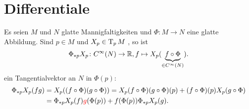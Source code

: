 
\chapter{Differentiale}
Es seien $M$ und $N$ glatte Mannigfaltigkeiten und $\Phi \colon M \to N$ eine glatte Abbildung.
Sind $p \in M$ und $X_p \in \operatorname{T}_pM$ , so ist 
\begin{align*}
	\Phi_{*p}X_p \colon C^{\infty}(N) \to \operatorname{\mathbb{R}}, f \mapsto X_p(\underbrace{f \circ \Phi}_{\in C^{\infty}(N)}).
\end{align*}
ein Tangentialvektor an $N$ in $\Phi(p)$:
\begin{align*}
	\Phi_{*p}X_p(fg) & = X_p((f \circ \Phi)(g \circ \Phi)) = X_p(f \circ \Phi)(g \circ \Phi)(p) + (f \circ \Phi)(p)X_p(g \circ \Phi)\\
	& = \Phi_{*p}X_p(f)\textcolor{red}{g}(\Phi(p)) + f(\Phi(p)) \Phi_{*p}X_p(g).
\end{align*}
